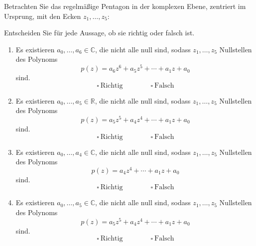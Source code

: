 \documentclass[11pt,a4paper]{article}
\newcommand{\C}{\mathbb C}
\newcommand{\R}{\mathbb R}
\newcommand{\Ree}{\operatorname{Re}}
\newcommand{\Imm}{\operatorname{Im}}
\newcommand{\1}{\mathbf 1}
\begin{document}
\begin{mcbox}[title=MC-Training: Polynome und Nullstellen]
Betrachten Sie das regelmäßige Pentagon in der komplexen Ebene, zentriert im
Ursprung, mit den Ecken $z_1,\ldots,z_5$:
\begin{center}
\end{center}
Entscheiden Sie für jede Aussage, ob sie richtig oder falsch ist.
\begin{enumerate}
\item Es existieren $a_0,\ldots,a_6\in\C$, die nicht alle null sind, sodass
$z_1,\ldots,z_5$ Nullstellen des Polynoms
\[
p(z)=a_6z^6+a_5z^5+\cdots+a_1z+a_0
\]
sind.
\[
\square\ \text{Richtig}\qquad\qquad\square\ \text{Falsch}
\]

\item Es existieren $a_0,\ldots,a_5\in\R$, die nicht alle null sind, sodass
$z_1,\ldots,z_5$ Nullstellen des Polynoms
\[
p(z)=a_5z^5+a_4z^4+\cdots+a_1z+a_0
\]
sind.
\[
\square\ \text{Richtig}\qquad\qquad\square\ \text{Falsch}
\]

\item Es existieren $a_0,\ldots,a_4\in\C$, die nicht alle null sind, sodass
$z_1,\ldots,z_5$ Nullstellen des Polynoms
\[
p(z)=a_4z^4+\cdots+a_1z+a_0
\]
sind.
\[
\square\ \text{Richtig}\qquad\qquad\square\ \text{Falsch}
\]

\item Es existieren $a_0,\ldots,a_5\in\C$, die nicht alle null sind, sodass
$z_1,\ldots,z_5$ Nullstellen des Polynoms
\[
p(z)=a_5z^5+a_4z^4+\cdots+a_1z+a_0
\]
sind.
\[
\square\ \text{Richtig}\qquad\qquad\square\ \text{Falsch}
\]
\end{enumerate}
\end{mcbox}
\end{document}
